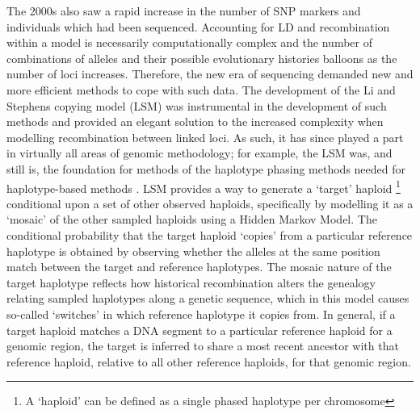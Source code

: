 The 2000s also saw a rapid increase in the number of SNP markers and individuals which had been sequenced. Accounting for LD and recombination within a model is necessarily computationally complex and the number of combinations of alleles and their possible evolutionary histories balloons as the number of loci increases. Therefore, the new era of sequencing demanded new and more efficient methods to cope with such data. The development of the Li and Stephens copying model (LSM) \cite{Li2003} was instrumental in the development of such methods \cite{song2016li} and provided an elegant solution to the increased complexity when modelling recombination between linked loci. As such, it has since played a part in virtually all areas of genomic methodology; for example, the LSM was, and still is, the foundation for methods of the haplotype phasing methods needed for haplotype-based methods \cite{stephens2003comparison, stephens2005accounting}.  LSM provides a way to generate a `target' haploid \footnote{A `haploid' can be defined as a single phased haplotype per chromosome} conditional upon a set of other observed haploids, specifically by modelling it as a `mosaic' of  the other sampled haploids using a Hidden Markov Model. The conditional probability that the target haploid `copies' from a particular reference haplotype is obtained by observing whether the alleles at the same position match between the target and reference haplotypes. The mosaic nature of the target haplotype reflects how historical recombination alters the genealogy relating sampled haplotypes along a genetic sequence, which in this model causes so-called `switches' in which reference haplotype it copies from. In general, if a target haploid matches a DNA segment to a particular reference haploid for a genomic region, the target is inferred to share a most recent ancestor with that reference haploid, relative to all other reference haploids, for that genomic region.

